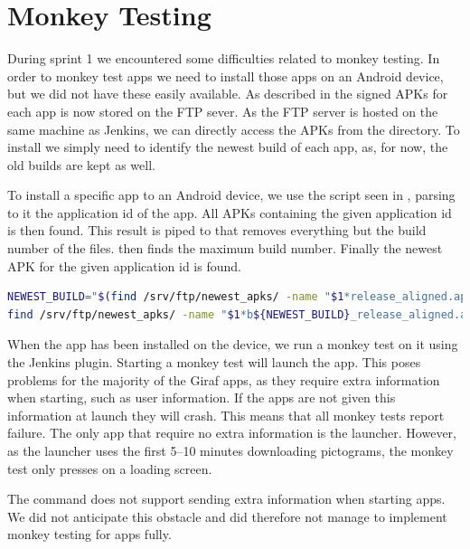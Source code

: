 \section{Monkey Testing}\label{sec:monkey_testing_s2}
During sprint 1 we encountered some difficulties related to monkey testing. In order to monkey test apps we need to install those apps on an Android device, but we did not have these easily available. As described in  the signed APKs for each app is now stored on the FTP sever. As the FTP server is hosted on the same machine as Jenkins, we can directly access the APKs from the directory. To install we simply need to identify the newest build of each app, as, for now, the old builds are kept as well.  

To install a specific app to an Android device, we use the script seen in , parsing to it the application id of the app. All APKs containing the given application id is then found. This result is piped to  that removes everything but the build number of the files.  \parencite{stackoverflow-max-number2012} then finds the maximum build number. Finally the newest APK for the given application id is found.

\begin{lstlisting}[language=bash,showstringspaces=false,caption=Script that finds the newest build number for a particular application id,label=lst:find_newest_apk]
NEWEST_BUILD="$(find /srv/ftp/newest_apks/ -name "$1*release_aligned.apk" | sed 's/.*b//' | sed 's/_release_aligned.apk//' | awk '$0>x{x=$0};END{print x}')"
find /srv/ftp/newest_apks/ -name "$1*b${NEWEST_BUILD}_release_aligned.apk"
\end{lstlisting}

When the app has been installed on the device, we run a monkey test on it using the Jenkins plugin. Starting a monkey test will launch the app. This poses problems for the majority of the Giraf apps, as they require extra information when starting, such as user information. If the apps are not given this information at launch they will crash. This means that all monkey tests report failure. The only app that require no extra information is the launcher. However, as the launcher uses the first 5--10 minutes downloading pictograms, the monkey test only presses on a loading screen.

The  command does not support sending extra information when starting apps. We did not anticipate this obstacle and did therefore not manage to implement monkey testing for apps fully.

